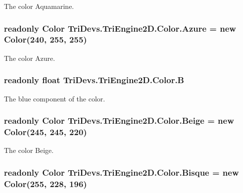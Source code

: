 The color Aquamarine. 

\hypertarget{struct_tri_devs_1_1_tri_engine2_d_1_1_color_ab567e615caa69a803617e019f2710e14}{
\subsubsection[{Azure}]{\setlength{\rightskip}{0pt plus 5cm}readonly {\bf Color} Tri\-Devs.\-Tri\-Engine2\-D.\-Color.\-Azure = new {\bf Color}(240, 255, 255)\hspace{0.3cm}{\ttfamily [static]}}}\label{struct_tri_devs_1_1_tri_engine2_d_1_1_color_ab567e615caa69a803617e019f2710e14}


The color Azure. 

\hypertarget{struct_tri_devs_1_1_tri_engine2_d_1_1_color_afa0a5303b8b93c319df33909f9361e6f}{
\subsubsection[{B}]{\setlength{\rightskip}{0pt plus 5cm}readonly float Tri\-Devs.\-Tri\-Engine2\-D.\-Color.\-B}}\label{struct_tri_devs_1_1_tri_engine2_d_1_1_color_afa0a5303b8b93c319df33909f9361e6f}


The blue component of the color. 

\hypertarget{struct_tri_devs_1_1_tri_engine2_d_1_1_color_a8398377c9baaab3a7bab92b582c54d5b}{
\subsubsection[{Beige}]{\setlength{\rightskip}{0pt plus 5cm}readonly {\bf Color} Tri\-Devs.\-Tri\-Engine2\-D.\-Color.\-Beige = new {\bf Color}(245, 245, 220)\hspace{0.3cm}{\ttfamily [static]}}}\label{struct_tri_devs_1_1_tri_engine2_d_1_1_color_a8398377c9baaab3a7bab92b582c54d5b}


The color Beige. 

\hypertarget{struct_tri_devs_1_1_tri_engine2_d_1_1_color_a172f4da22584e3b955f3eb3060517143}{
\subsubsection[{Bisque}]{\setlength{\rightskip}{0pt plus 5cm}readonly {\bf Color} Tri\-Devs.\-Tri\-Engine2\-D.\-Color.\-Bisque = new {\bf Color}(255, 228, 196)\hspace{0.3cm}{\ttfamily [static]}}}\label{struct_tri_devs_1_1_tri_engine2_d_1_1_color_a172f4da22584e3b955f3eb3060517143}


